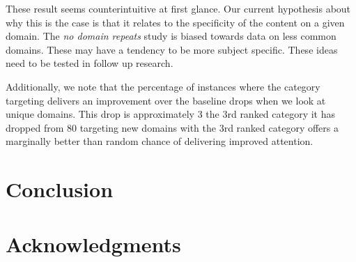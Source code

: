 \documentclass[sigconf]{acmart}
\begin{document}
These result seems counterintuitive at first glance. Our current hypothesis about why
this is the case is that it relates to the specificity of the content on a given domain.
The \emph{no domain repeats} study is biased towards data on less common domains.
These may have a tendency to be more subject specific.
These ideas need to be tested in follow up research.

Additionally, we note that the percentage of instances where the category targeting
delivers an improvement over the baseline drops when we look at unique domains.
This drop is approximately 3%
the 3rd ranked category it has dropped from 80%
targeting new domains with the 3rd ranked category offers a marginally better than
random chance of delivering improved attention.


\section{Conclusion}

\section{Acknowledgments}



\end{document}
